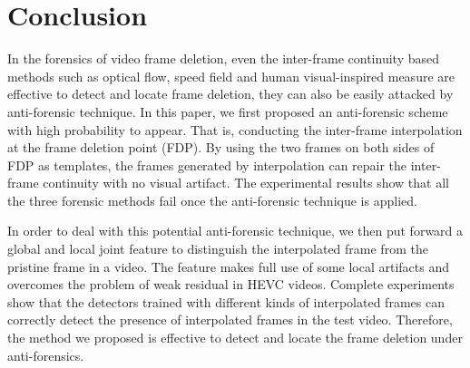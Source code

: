 \documentclass[pdftex,twocolumn,epjc3]{svjour3}          %
\begin{document}

\section{Conclusion}
\label{sec:Conclusion}
In the forensics of video frame deletion, even the inter-frame continuity based methods such as optical flow, speed field and human visual-inspired measure are effective to detect and locate frame deletion, they can also be easily attacked by anti-forensic technique. In this paper, we first proposed an anti-forensic scheme with high probability to appear. That is, conducting the inter-frame interpolation at the frame deletion point (FDP). By using the two frames on both sides of FDP as templates, the frames generated by interpolation can repair the inter-frame continuity with no visual artifact. The experimental results show that all the three forensic methods fail once the anti-forensic technique is applied.

In order to deal with this potential anti-forensic technique, we then put forward a global and local joint feature to distinguish the interpolated frame from the pristine frame in a video. The feature makes full use of some local artifacts and overcomes the problem of weak residual in HEVC videos. Complete experiments show that the detectors trained with different kinds of interpolated frames can correctly detect the presence of interpolated frames in the test video. Therefore, the method we proposed is effective to detect and locate the frame deletion under anti-forensics.
\end{document}
